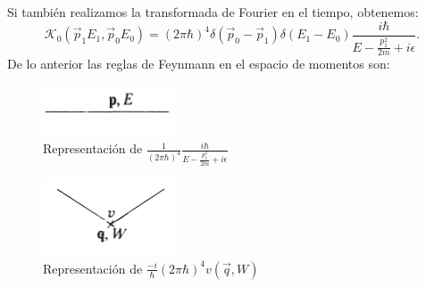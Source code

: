 Si también realizamos la transformada de Fourier en el tiempo, obtenemos:
\begin{equation}
\mathcal{K}_0(\vec{p}_1E_1,\vec{p}_0E_0)=(2\pi\hbar)^4\delta(\vec{p}_0-\vec{p}_1)\delta(E_1-E_0)\frac{i\hbar}{E-\frac{p_{1}^{2}}{2m}+i\epsilon}.
\end{equation}
De lo anterior las reglas de Feynmann en el espacio de momentos son:
\begin{figure}
\caption[Diagrama de Feynmann primera cuantización]{Representación de $\frac{1}{(2\pi\hbar)^4}\frac{i\hbar}{E-\frac{p_{1}^{2}}{2m}+i\epsilon}$}
\includegraphics[width=4cm]{Imagenes/Fig6}
\end{figure}
\begin{figure}
\caption[Diagrama de Feynmann primera cuantización]{Representación de $\frac{-i}{\hbar}(2\pi\hbar)^4v(\vec{q},W)$}
\includegraphics[width=4cm]{Imagenes/Fig7}
\end{figure}

